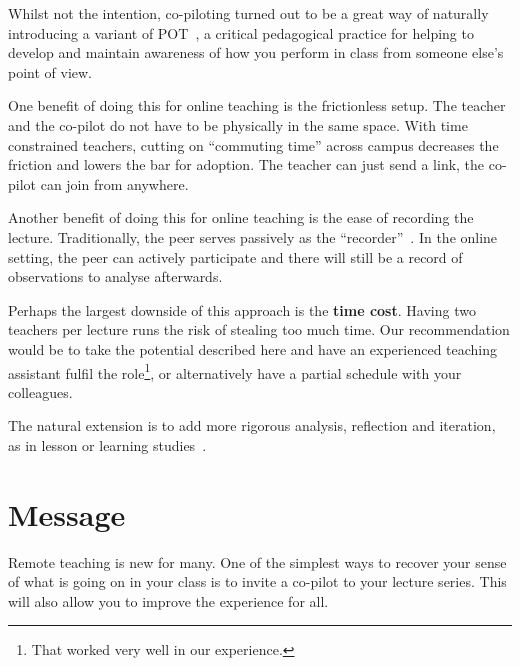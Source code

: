 \documentclass{article}
\begin{document}
Whilst not the intention, co-piloting turned out to be a great way of naturally 
introducing a variant of 
\ac{POT}~\cite[\cf][]{PeerObservation,ReflectivePeerObservation},
a critical 
pedagogical practice for helping to develop and maintain awareness of how you 
perform in class from someone else's point of view.

One benefit of doing this for online teaching is the frictionless setup. The 
teacher and the co-pilot do not have to be physically in the same space.
With time constrained teachers, cutting on \enquote{commuting time} across 
campus decreases the friction and lowers the bar for adoption.
The teacher can just send a link, the co-pilot can join from anywhere.

Another benefit of doing this for online teaching is the ease of recording the 
lecture.
Traditionally, the peer serves passively as the 
\enquote{recorder}~\cite{PeerObservation,ReflectivePeerObservation}.
In the online setting, the peer can actively participate and there will still 
be a record of observations to analyse afterwards.

Perhaps the largest downside of this approach is the \textbf{time cost}. Having 
two teachers per lecture runs the risk of stealing too much time. Our 
recommendation would be to take the potential described here and have an 
experienced teaching assistant fulfil the role\footnote{%
  That worked very well in our experience.
}, or alternatively have a partial schedule
with your colleagues.

The natural extension is to add more rigorous analysis, reflection and 
iteration, as in lesson or learning 
studies~\cite{NecessaryConditionsOfLearning}.


\section*{Message}

Remote teaching is new for many.
One of the simplest ways to recover your sense of what is going on in your class is to invite a co-pilot to your lecture series.
This will also allow you to improve the experience for all.

\printbibliography
\end{document}
